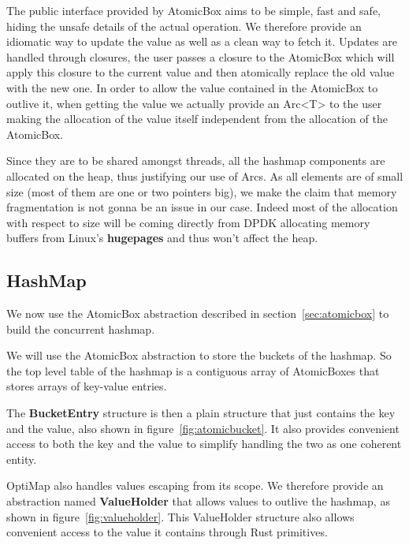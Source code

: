 The public interface provided by AtomicBox aims to be simple, fast and
safe, hiding the unsafe details of the actual operation. We therefore
provide an idiomatic way to update the value as well as a clean way to
fetch it. Updates are handled through closures, the user passes
a closure to the AtomicBox which will apply this closure to the
current value and then atomically replace the old value with the new
one. In order to allow the value contained in the AtomicBox to outlive
it, when getting the value we actually provide an Arc<T> to the user
making the allocation of the value itself independent from the
allocation of the AtomicBox.

Since they are to be shared amongst threads, all the hashmap
components are allocated on the heap, thus justifying our use of
Arcs. As all elements are of small size (most of them are one or two
pointers big), we make the claim that memory fragmentation is not
gonna be an issue in our case. Indeed most of the allocation with
respect to size will be coming directly from DPDK allocating memory
buffers from Linux's \textbf{hugepages} and thus won't affect the
heap.

\subsection{HashMap}

We now use the AtomicBox abstraction described in
section~\ref{sec:atomicbox} to build the concurrent hashmap.

We will use the AtomicBox abstraction to store the buckets of the
hashmap. So the top level table of the hashmap is a contiguous array
of AtomicBoxes that stores arrays of key-value entries.



The \textbf{BucketEntry} structure is then a plain structure that just
contains the key and the value, also shown in
figure~\ref{fig:atomicbucket}. It also provides convenient access to
both the key and the value to simplify handling the two as one
coherent entity.

OptiMap also handles values escaping from its scope. We therefore
provide an abstraction named \textbf{ValueHolder} that allows values to
outlive the hashmap, as shown in figure~\ref{fig:valueholder}. This
ValueHolder structure also allows convenient access to the value it
contains through Rust primitives.



